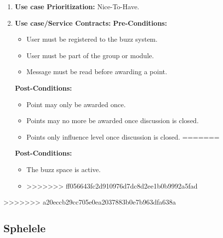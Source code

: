 \documentclass[11pt]{article}
\begin{document}
\begin{enumerate}
\begin{enumerate}
\item 
\textbf{Use case Prioritization:} Nice-To-Have.

\item 
\textbf{Use case/Service Contracts:} 
\newline
\textbf{Pre-Conditions: }
\begin{itemize}
\item User must be registered to the buzz system.
\item User must be part of the group or module.
\item Message must be read before awarding a point.
\end{itemize}
 

\textbf{Post-Conditions: }
\begin{itemize}
\item Point may only be awarded once.
\item Points may no more be awarded once discussion is closed.
\item Points only influence level once discussion is closed.
=======
\end{itemize}
\textbf{Post-Conditions: }
\begin{itemize}
\item The buzz space is active.
\item 
>>>>>>> ff056643fc2d910976d7dc8d2ee1b0b9992a5fad
\end{itemize}
\end{enumerate}

\newpage
>>>>>>> a20eccb29cc705e0ea2037883b0e7b963dfa638a

\subsection{Sphelele}

\end{enumerate}
\end{document}
